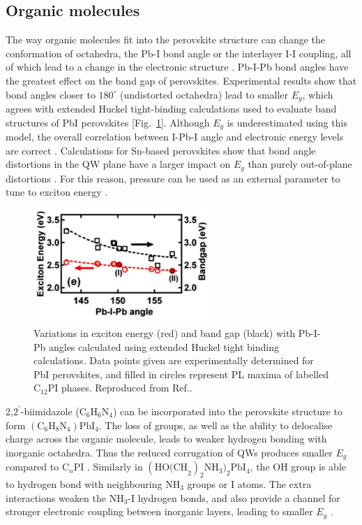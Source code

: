 \subsection{Organic molecules}
The way organic molecules fit into the perovskite structure can change the conformation of  octahedra, the Pb-I bond angle or the interlayer I-I coupling, all of which lead to a change in the electronic structure \cite{Sourisseau2007}. Pb-I-Pb bond angles have the greatest effect on the band gap of perovskites. Experimental results show that bond angles closer to $180^{\circ}$ (undistorted octahedra) lead to smaller $E_g$, which agrees with extended Huckel tight-binding calculations used to evaluate band structures of PbI perovskites [Fig.\ \ref{2Fig19}]. Although $E_g$ is underestimated using this model, the overall correlation between I-Pb-I angle and electronic energy levels are correct \cite{Pradeesh2009}. Calculations for Sn-based perovskites show that bond angle distortions in the QW plane have a larger impact on $E_g$ than purely out-of-plane distortions \cite{Knutson2005}. For this reason, pressure can be used as an external parameter to tune to exciton energy \cite{Matsuishi2001}.
\begin{figure}[h!]
\centering
\includegraphics[width=0.6\textwidth]{Fig19}
\caption{Variations in exciton energy (red) and band gap (black) with Pb-I-Pb angles calculated using extended Huckel tight binding calculations. Data points given are experimentally determined for PbI perovskites, and filled in circles represent PL maxima of labelled $\textrm{C}_{12}$PI phases. Reproduced from Ref.\!.}
\label{2Fig19}
\end{figure}

2,$2^{'}$-biimidazole ($\textrm{C}_6\textrm{H}_6\textrm{N}_4$) can be incorporated into the perovskite structure to form $(\textrm{C}_6\textrm{H}_8\textrm{N}_4)\textrm{PbI}_4$. The loss of  groups, as well as the ability to delocalise charge across the organic molecule, leads to weaker hydrogen bonding with inorganic octahedra. Thus the reduced corrugation of QWs produces smaller $E_g$ compared to C$_n$PI \cite{Tang2001}. Similarly in $(\textrm{HO(CH}_2)_2\textrm{NH}_3)_2\textrm{PbI}_4$, the OH group is able to hydrogen bond with neighbouring $\textrm{NH}_3$ groups or I atoms. The extra interactions weaken the $\textrm{NH}_3$-I hydrogen bonds, and also provide a channel for stronger electronic coupling between inorganic layers, leading to smaller $E_g$ \cite{Mercier2004}.

